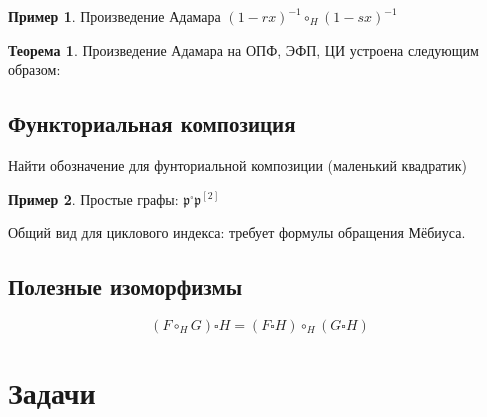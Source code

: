 \documentclass{article}
\theoremstyle{definition}
\newtheorem{example}{Пример}
\newtheorem*{theorem}{Теорема}
\begin{document}
\begin{example}
	Произведение Адамара \( (1 - rx)^{-1} \circ_{H} (1 - sx)^{-1}\)
\end{example}

\begin{theorem}
	Произведение Адамара на ОПФ, ЭФП, ЦИ устроена следующим образом:
\end{theorem}

\subsection{Функториальная композиция}

Найти обозначение для фунториальной композиции (маленький квадратик)

\begin{example}
	Простые графы: \( \mathfrak p {}^\square \mathfrak p^{[2]}  \)
\end{example}

Общий вид для циклового индекса: требует формулы обращения Мёбиуса.

\subsection{Полезные изоморфизмы}

\[
	(F \circ_{H} G) \square H = (F \square H) \circ_{H} (G \square H)
\]

\section{Задачи}
\end{document}
